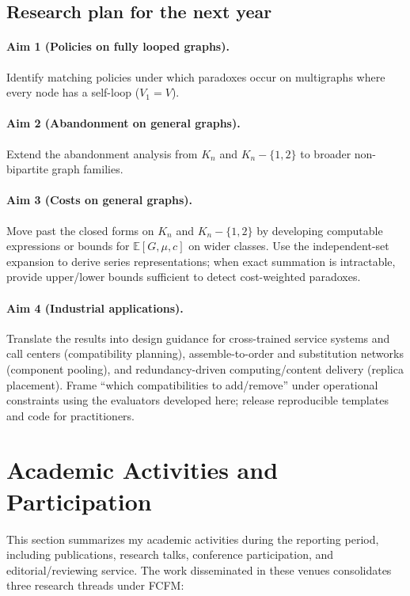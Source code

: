 \documentclass[11pt]{article}
\begin{document}
\subsection*{Research plan for the next year}

\paragraph{Aim 1 (Policies on fully looped graphs).}
Identify matching policies under which paradoxes occur on multigraphs where every node has a self-loop ($V_1=V$). 

\paragraph{Aim 2 (Abandonment on general graphs).}
Extend the abandonment analysis from $K_n$ and $K_n-\{1,2\}$ to broader non-bipartite graph families. 

\paragraph{Aim 3 (Costs on general graphs).}
Move past the closed forms on $K_n$ and $K_n-\{1,2\}$ by developing computable expressions or bounds for $\mathbb{E}[G,\mu,c]$ on wider classes. Use the independent-set expansion to derive series representations; when exact summation is intractable, provide upper/lower bounds sufficient to detect cost-weighted paradoxes.

\paragraph{Aim 4 (Industrial applications).}
Translate the results into design guidance for cross-trained service systems and call centers (compatibility planning), assemble-to-order and substitution networks (component pooling), and redundancy-driven computing/content delivery (replica placement). Frame “which compatibilities to add/remove” under operational constraints using the evaluators developed here; release reproducible templates and code for practitioners.



\section{Academic Activities and Participation}\label{sec:activities}

This section summarizes my academic activities during the reporting period, including publications, research talks, conference participation, and editorial/reviewing service. The work disseminated in these venues consolidates three research threads under \textsc{FCFM}:
\end{document}
